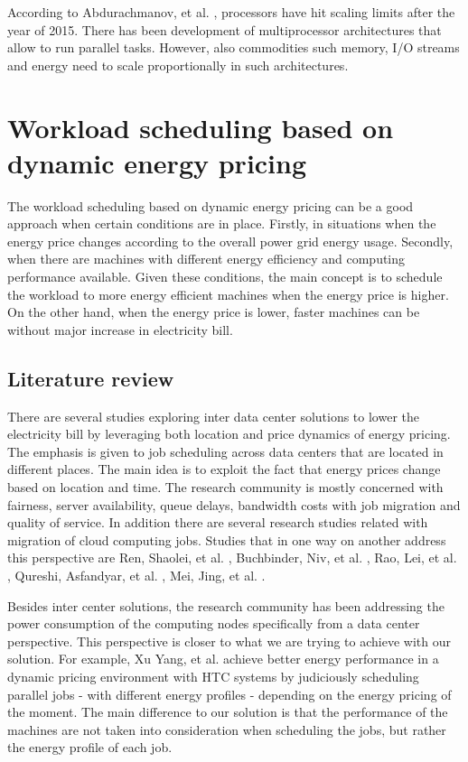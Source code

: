 According to Abdurachmanov, et al. \cite{ACAT13ARM}, processors have hit scaling limits after the year of 2015. There has been development of multiprocessor architectures that
allow to run parallel tasks. However, also commodities such memory, I/O streams and energy need to scale proportionally in such architectures.



\section{Workload scheduling based on dynamic energy pricing}

The workload scheduling based on dynamic energy pricing can be a good approach when certain conditions are in place. Firstly, in situations when the energy price changes according to the overall power grid energy usage. Secondly, when there are machines with different energy efficiency and computing performance available. Given these conditions, the main concept is to schedule the workload to more energy efficient machines when the energy price is higher. On the other hand, when the energy price is lower, faster machines can be without major increase in electricity bill.


\subsection*{Literature review}

There are several studies exploring inter data center solutions to lower
the electricity bill by leveraging both location and price dynamics of energy pricing. The 
emphasis is given to job scheduling across data centers that are located in 
different places. The main idea is to exploit the fact that energy prices change based on location and time. The research community is mostly concerned 
with fairness, server availability, queue delays, bandwidth costs with job migration
and quality of service. In addition there are several research studies related with 
migration of cloud computing jobs. Studies that in one way on another address this 
perspective are Ren, Shaolei, et al. \cite{EFF_JOB_SCHEDULING}, Buchbinder, Niv, et al. \cite{MIGRATION_CLOUD}, Rao, Lei, et al.
\cite{MINIMIZING_DIST}, Qureshi, Asfandyar, et al. \cite{CUTTING_BILL}, Mei, Jing, et al. \cite{SCHED_HETEROGE}.

Besides inter center solutions, the research community has been addressing the power 
consumption of the computing nodes specifically from a data center perspective.
This perspective is closer to what we are trying to achieve with our solution.
For example,  Xu Yang, et al. \cite{DYN_PRICING_HPC} achieve better energy performance in a dynamic
pricing environment with HTC systems by judiciously scheduling parallel jobs -
with different energy profiles - depending on the energy pricing of the
moment. The main difference to our solution is that the performance of the machines 
are not taken into consideration when scheduling the jobs, but rather the energy 
profile of each job.

